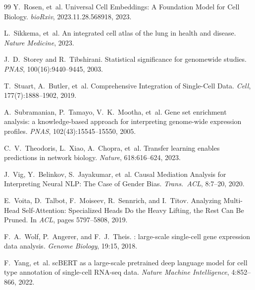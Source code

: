 \documentclass[11pt]{article}
\begin{document}
\begin{thebibliography}{99}
Y.~Rosen, et~al.
\newblock Universal Cell Embeddings: A Foundation Model for Cell Biology.
\newblock \emph{bioRxiv}, 2023.11.28.568918, 2023.

L.~Sikkema, et~al.
\newblock An integrated cell atlas of the lung in health and disease.
\newblock \emph{Nature Medicine}, 2023.

J.~D.~Storey and R.~Tibshirani.
\newblock Statistical significance for genomewide studies.
\newblock \emph{PNAS}, 100(16):9440--9445, 2003.

T.~Stuart, A.~Butler, et~al.
\newblock Comprehensive Integration of Single-Cell Data.
\newblock \emph{Cell}, 177(7):1888--1902, 2019.

A.~Subramanian, P.~Tamayo, V.~K.~Mootha, et~al.
\newblock Gene set enrichment analysis: a knowledge-based approach for interpreting genome-wide expression profiles.
\newblock \emph{PNAS}, 102(43):15545--15550, 2005.

C.~V.~Theodoris, L.~Xiao, A.~Chopra, et~al.
\newblock Transfer learning enables predictions in network biology.
\newblock \emph{Nature}, 618:616--624, 2023.

J.~Vig, Y.~Belinkov, S.~Jayakumar, et~al.
\newblock Causal Mediation Analysis for Interpreting Neural NLP: The Case of Gender Bias.
\newblock \emph{Trans.~ACL}, 8:7--20, 2020.

E.~Voita, D.~Talbot, F.~Moiseev, R.~Sennrich, and I.~Titov.
\newblock Analyzing Multi-Head Self-Attention: Specialized Heads Do the Heavy Lifting, the Rest Can Be Pruned.
\newblock In \emph{ACL}, pages 5797--5808, 2019.

F.~A.~Wolf, P.~Angerer, and F.~J.~Theis.
: large-scale single-cell gene expression data analysis.
\newblock \emph{Genome Biology}, 19:15, 2018.

F.~Yang, et~al.
\newblock sc{BERT} as a large-scale pretrained deep language model for cell type annotation of single-cell {RNA}-seq data.
\newblock \emph{Nature Machine Intelligence}, 4:852--866, 2022.

\end{thebibliography}
\end{document}
